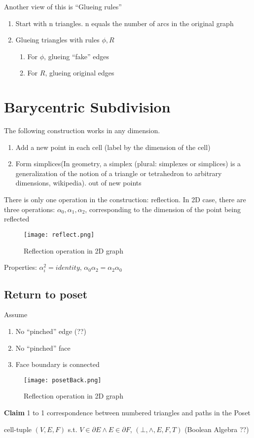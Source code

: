 \documentclass[12pt]{article}
\newcommand{\claim}[1]{\par {\bf Claim }{#1}}
\begin{document}
Another view of this is ``Glueing rules''
\begin{enumerate}[1)]
\item Start with n triangles. n equals the number of arcs in the
  original graph
\item Glueing triangles with rules $\phi, R$
  \begin{enumerate}
  \item For $\phi$, glueing ``fake'' edges
  \item For $R$, glueing original edges
  \end{enumerate}
\end{enumerate}
\section{Barycentric Subdivision}
The following construction works in any dimension.
\begin{enumerate}[1)]
\item Add a new point in each cell (label by the dimension of the
  cell)
\item Form simplices(In geometry, a simplex (plural: simplexes or
  simplices) is a generalization of the notion of a triangle or
  tetrahedron to arbitrary dimensions, wikipedia).  out of new points
\end{enumerate}
There is only one operation in the construction: reflection. In 2D
case, there are three operations: $\alpha_0, \alpha_1, \alpha_2$,
corresponding to the dimension of the point being reflected
\begin{figure}[h!]
  \centering
  \texttt{[image: reflect.png]}
  \caption{Reflection operation in 2D graph}
  \label{fig:reflect}
\end{figure}
Properties: $\alpha_i^2 = identity$,
$\alpha_0\alpha_2 = \alpha_2\alpha_0$
\subsection{Return to poset}
Assume
\begin{enumerate}[1)]
\item No ``pinched'' edge (??)
\item No ``pinched'' face
\item Face boundary is connected
\end{enumerate}
\begin{figure}[h!]
  \centering
  \texttt{[image: posetBack.png]}
  \caption{Reflection operation in 2D graph}
  \label{fig:posetBack}
\end{figure}
\claim{1 to 1 correspondence between numbered triangles and paths in
  the Poset}
\begin{definition}
  cell-tuple $(V, E, F)$ s.t. $V \in \partial E \land E \in \partial
  F$, $(\bot, \land, E, F, T)$ (Boolean Algebra ??)
\end{definition}

 \pagebreak


\end{document}
